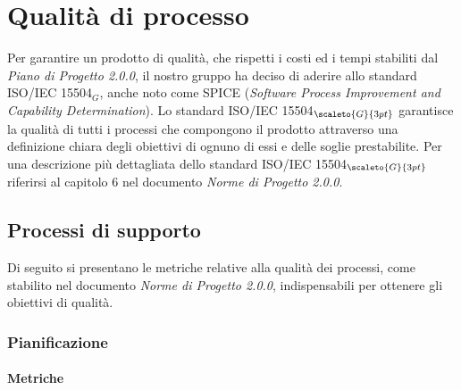 \chapter{Qualità di processo}\label{QualitàDiProcesso}
Per garantire un prodotto di qualità, che rispetti i costi ed i tempi stabiliti dal \textit{Piano di Progetto 2.0.0}, il nostro gruppo ha deciso di aderire allo standard ISO/IEC 15504$_G$, anche noto come SPICE (\textit{Software Process Improvement and Capability Determination}).
Lo standard ISO/IEC 15504$_{\scaleto{G}{3pt}}$ garantisce la qualità di tutti i processi che compongono il prodotto attraverso una definizione chiara degli obiettivi di ognuno di essi e delle soglie prestabilite.
Per una descrizione più dettagliata dello standard ISO/IEC 15504$_{\scaleto{G}{3pt}}$
riferirsi al capitolo 6 nel documento \textit{Norme di Progetto 2.0.0}.

\section{Processi di supporto}\label{QualitaDiProcessoProcessiDiSupporto}
Di seguito si presentano le metriche relative alla qualità dei processi, come stabilito nel
documento \textit{Norme di Progetto 2.0.0}, indispensabili per ottenere gli obiettivi di qualità.
\subsection{Pianificazione}\label{QualitaDiProcessoProcessiDiSupportoPianificazione}

\subsubsection{Metriche}\label{QualitaDiProcessoProcessiDiSupportoMetriche}

